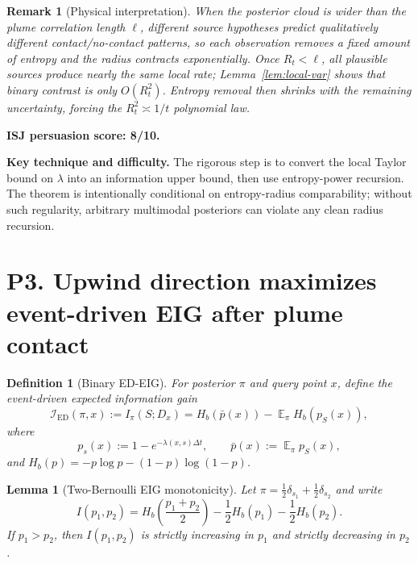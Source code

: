 \documentclass[11pt]{article}
\newtheorem{lemma}[theorem]{Lemma}
\newtheorem{definition}[theorem]{Definition}
\newtheorem{remark}[theorem]{Remark}
\DeclareMathOperator{\E}{\mathbb{E}}
\newcommand{\dt}{\Delta t}
\newcommand{\IED}{\mathcal{I}_{\mathrm{ED}}}
\begin{document}
\begin{remark}[Physical interpretation]
When the posterior cloud is wider than the plume correlation length $\ell$, different source hypotheses predict qualitatively different contact/no-contact patterns, so each observation removes a fixed amount of entropy and the radius contracts exponentially.  Once $R_t<\ell$, all plausible sources produce nearly the same local rate; Lemma~\ref{lem:local-var} shows that binary contrast is only $O(R_t^2)$.  Entropy removal then shrinks with the remaining uncertainty, forcing the $R_t^2\asymp 1/t$ polynomial law.
\end{remark}

\noindent\textbf{ISJ persuasion score: 8/10.}

\noindent\textbf{Key technique and difficulty.}
The rigorous step is to convert the local Taylor bound on $\lambda$ into an information upper bound, then use entropy-power recursion.  The theorem is intentionally conditional on entropy-radius comparability; without such regularity, arbitrary multimodal posteriors can violate any clean radius recursion.

\section{P3. Upwind direction maximizes event-driven EIG after plume contact}

\begin{definition}[Binary ED-EIG]\label{def:ed-eig}
For posterior $\pi$ and query point $x$, define the event-driven expected information gain
\begin{equation}
        \IED(\pi,x)
        :=
        I_{\pi}(S;D_x)
        =
        H_b(\bar{p}(x))-\E_{\pi}H_b(p_S(x)),
        \label{eq:ed-eig}
\end{equation}
where
\[
        p_s(x):=1-e^{-\lambda(x,s)\dt},
        \qquad
        \bar{p}(x):=\E_{\pi}p_S(x),
\]
and $H_b(p)=-p\log p-(1-p)\log(1-p)$.
\end{definition}

\begin{lemma}[Two-Bernoulli EIG monotonicity]\label{lem:two-bernoulli-monotonicity}
Let $\pi=\frac12\delta_{s_1}+\frac12\delta_{s_2}$ and write
\[
        I(p_1,p_2)
        =
        H_b\!\left(\frac{p_1+p_2}{2}\right)
        -
        \frac12H_b(p_1)-\frac12H_b(p_2).
\]
If $p_1>p_2$, then $I(p_1,p_2)$ is strictly increasing in $p_1$ and strictly decreasing in $p_2$.
\end{lemma}
\end{document}
